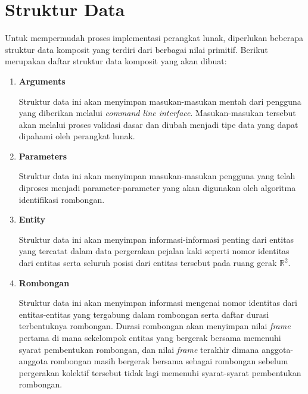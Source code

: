 \section{Struktur Data}
\label{sec:des-struct}

Untuk mempermudah proses implementasi perangkat lunak, diperlukan beberapa struktur data komposit yang terdiri dari berbagai nilai primitif. Berikut merupakan daftar struktur data komposit yang akan dibuat:

\begin{enumerate}
    \item \textbf{Arguments}
    
    Struktur data ini akan menyimpan masukan-masukan mentah dari pengguna yang diberikan melalui \textit{command line interface}. Masukan-masukan tersebut akan melalui proses validasi dasar dan diubah menjadi tipe data yang dapat dipahami oleh perangkat lunak.
    
    \item \textbf{Parameters}
    
    Struktur data ini akan menyimpan masukan-masukan pengguna yang telah diproses menjadi parameter-parameter yang akan digunakan oleh algoritma identifikasi rombongan.  
    
    \item \textbf{Entity}
    
    Struktur data ini akan menyimpan informasi-informasi penting dari entitas yang tercatat dalam data pergerakan pejalan kaki seperti nomor identitas dari entitas serta seluruh posisi dari entitas tersebut pada ruang gerak $\mathbb{R}^2$.
    
    \item \textbf{Rombongan}
    
    Struktur data ini akan menyimpan informasi mengenai nomor identitas dari entitas-entitas yang tergabung dalam rombongan serta daftar durasi terbentuknya rombongan. Durasi rombongan akan menyimpan nilai \textit{frame} pertama di mana sekelompok entitas yang bergerak bersama memenuhi syarat pembentukan rombongan, dan nilai \textit{frame} terakhir dimana anggota-anggota rombongan masih bergerak bersama sebagai rombongan sebelum pergerakan kolektif tersebut tidak lagi memenuhi syarat-syarat pembentukan rombongan.
\end{enumerate}